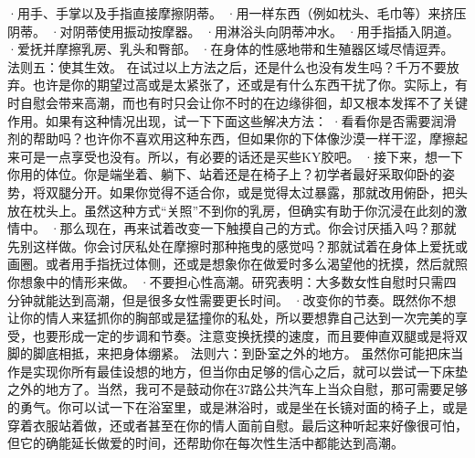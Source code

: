 \documentclass[12pt,UTF8,openany]{ctexbook}
\begin{document}
·用手、手掌以及手指直接摩擦阴蒂。
·用一样东西（例如枕头、毛巾等）来挤压阴蒂。
·对阴蒂使用振动按摩器。
·用淋浴头向阴蒂冲水。
·用手指插入阴道。
·爱抚并摩擦乳房、乳头和臀部。
·在身体的性感地带和生殖器区域尽情逗弄。
法则五：使其生效。
在试过以上方法之后，还是什么也没有发生吗？千万不要放弃。也许是你的期望过高或是太紧张了，还或是有什么东西干扰了你。实际上，有时自慰会带来高潮，而也有时只会让你不时的在边缘徘徊，却又根本发挥不了关键作用。如果有这种情况出现，试一下下面这些解决方法：
·看看你是否需要润滑剂的帮助吗？也许你不喜欢用这种东西，但如果你的下体像沙漠一样干涩，摩擦起来可是一点享受也没有。所以，有必要的话还是买些KY胶吧。
·接下来，想一下你用的体位。你是端坐着、躺下、站着还是在椅子上？初学者最好采取仰卧的姿势，将双腿分开。如果你觉得不适合你，或是觉得太过暴露，那就改用俯卧，把头放在枕头上。虽然这种方式“关照”不到你的乳房，但确实有助于你沉浸在此刻的激情中。
·那么现在，再来试着改变一下触摸自己的方式。你会讨厌插入吗？那就先别这样做。你会讨厌私处在摩擦时那种拖曳的感觉吗？那就试着在身体上爱抚或画圈。或者用手指抚过体侧，还或是想象你在做爱时多么渴望他的抚摸，然后就照你想象中的情形来做。
·不要担心性高潮。研究表明：大多数女性自慰时只需四分钟就能达到高潮，但是很多女性需要更长时间。
·改变你的节奏。既然你不想让你的情人来猛抓你的胸部或是猛撞你的私处，所以要想靠自己达到一次完美的享受，也要形成一定的步调和节奏。注意变换抚摸的速度，而且要伸直双腿或是将双脚的脚底相抵，来把身体绷紧。
法则六：到卧室之外的地方。
虽然你可能把床当作是实现你所有最佳设想的地方，但当你由足够的信心之后，就可以尝试一下床垫之外的地方了。当然，我可不是鼓动你在37路公共汽车上当众自慰，那可需要足够的勇气。你可以试一下在浴室里，或是淋浴时，或是坐在长镜对面的椅子上，或是穿着衣服站着做，还或者甚至在你的情人面前自慰。最后这种听起来好像很可怕，但它的确能延长做爱的时间，还帮助你在每次性生活中都能达到高潮。
\end{document}
